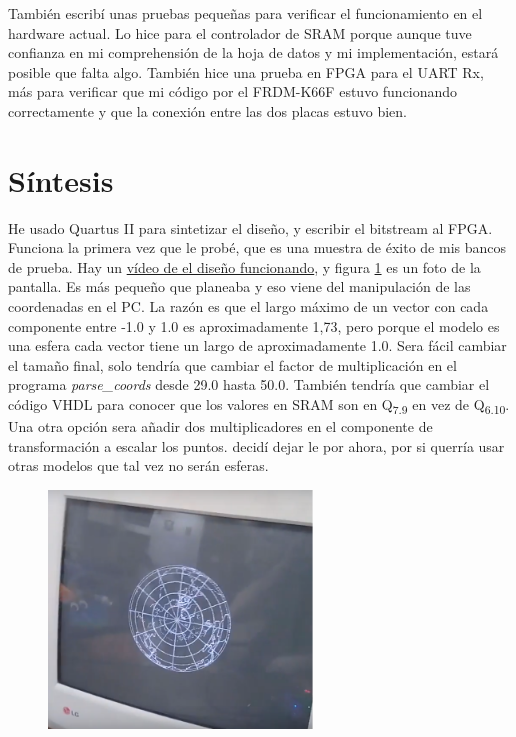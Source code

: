 \documentclass[a4paper]{article}
\begin{document}
También escribí unas pruebas pequeñas para verificar el funcionamiento en el hardware actual. Lo hice para el controlador de SRAM porque aunque tuve confianza en mi comprehensión de la hoja de datos y mi implementación, estará posible que falta algo. También hice una prueba en FPGA para el UART Rx, más para verificar que mi código por el FRDM-K66F estuvo funcionando correctamente y que la conexión entre las dos placas estuvo bien.

\section{Síntesis}

He usado Quartus II para sintetizar el diseño, y escribir el bitstream al FPGA. Funciona la primera vez que le probé, que es una muestra de éxito de mis bancos de prueba. Hay un \href{https://www.youtube.com/watch?v=NT7cE3yvwjY}{vídeo de el diseño funcionando}, y figura \ref{fig:monitor} es un foto de la pantalla. Es más pequeño que planeaba y eso viene del manipulación de las coordenadas en el PC. La razón es que el largo máximo de un vector con cada componente entre -1.0 y 1.0 es aproximadamente 1,73, pero porque el modelo es una esfera cada vector tiene un largo de aproximadamente 1.0. Sera fácil cambiar el tamaño final, solo tendría que cambiar el factor de multiplicación en el programa \textit{parse\_coords} desde 29.0 hasta 50.0. También tendría que cambiar el código VHDL para conocer que los valores en SRAM son en Q\textsubscript{7.9} en vez de Q\textsubscript{6.10}. Una otra opción sera añadir dos multiplicadores en el componente de transformación a escalar los puntos. decidí dejar le por ahora, por si querría usar otras modelos que tal vez no serán esferas.

\begin{figure}[!h]
\centering
\includegraphics[width=7cm]{img/monitor.png}
\label{fig:monitor}
\end{figure}
\end{document}
